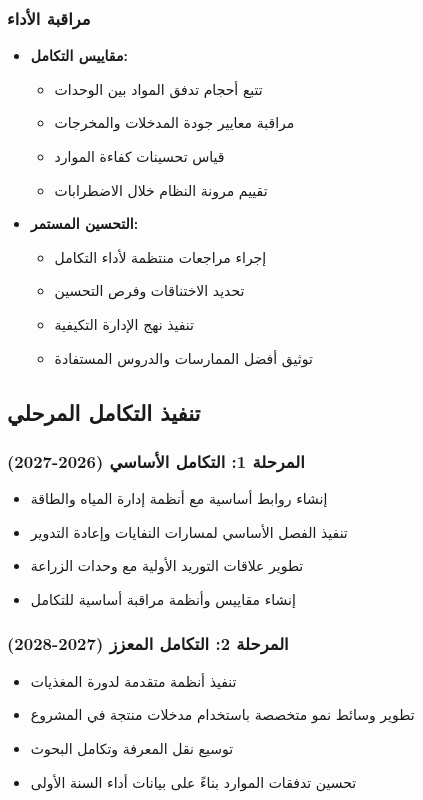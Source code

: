 \subsubsection{مراقبة الأداء}
\begin{itemize}
    \item \textbf{مقاييس التكامل:}
    \begin{itemize}
        \item تتبع أحجام تدفق المواد بين الوحدات
        \item مراقبة معايير جودة المدخلات والمخرجات
        \item قياس تحسينات كفاءة الموارد
        \item تقييم مرونة النظام خلال الاضطرابات
    \end{itemize}
    
    \item \textbf{التحسين المستمر:}
    \begin{itemize}
        \item إجراء مراجعات منتظمة لأداء التكامل
        \item تحديد الاختناقات وفرص التحسين
        \item تنفيذ نهج الإدارة التكيفية
        \item توثيق أفضل الممارسات والدروس المستفادة
    \end{itemize}
\end{itemize}

\subsection{تنفيذ التكامل المرحلي}

\subsubsection{المرحلة 1: التكامل الأساسي (2026-2027)}
\begin{itemize}
    \item إنشاء روابط أساسية مع أنظمة إدارة المياه والطاقة
    \item تنفيذ الفصل الأساسي لمسارات النفايات وإعادة التدوير
    \item تطوير علاقات التوريد الأولية مع وحدات الزراعة
    \item إنشاء مقاييس وأنظمة مراقبة أساسية للتكامل
\end{itemize}

\subsubsection{المرحلة 2: التكامل المعزز (2027-2028)}
\begin{itemize}
    \item تنفيذ أنظمة متقدمة لدورة المغذيات
    \item تطوير وسائط نمو متخصصة باستخدام مدخلات منتجة في المشروع
    \item توسيع نقل المعرفة وتكامل البحوث
    \item تحسين تدفقات الموارد بناءً على بيانات أداء السنة الأولى
\end{itemize}

